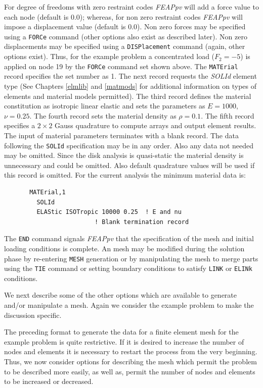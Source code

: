 For degree of freedoms with zero restraint codes {\sl FEAPpv} will add a force
value to each node (default is 0.0);
whereas, for non zero restraint codes {\sl FEAPpv} will
impose a displacement value (default is 0.0).  Non zero forces may
be specified using a {\tt FORCe} command (other options also exist
as described later).  Non zero displacements may be specified using
a {\tt DISPlacement} command (again, other options exist).
Thus, for the example problem
a concentrated load ($F_2 = -5$) is applied on node 19 by the {\tt FORCe}
command set shown above.
The {\tt MATErial} record specifies the set number as 1.  The
next record requests the {\it SOLId} element type (See Chapters \ref{elmlib}
and \ref{matmods} for
additional information on types of elements and material models permitted).
The third record defines the material constitution as isotropic linear
elastic and sets the parameters
as $E = 1000$, $\nu = 0.25$.
The fourth record sets the material density as $\rho = 0.1$.
The fifth record specifies a $2 \times 2$ Gauss quadrature
to compute arrays and output element results.
The input of material parameters terminates with a blank record.  The data
following the {\tt SOLId} specification may be in any order.  Also any data
not needed may be omitted.  Since the disk analysis is quasi-static the
material density is unnecessary and could be omitted.  Also default quadrature
values will be used if this record is omitted.  For the current analysis the
minimum material data is:
\begin{verbatim}
       MATErial,1
         SOLId
         ELAStic ISOTropic 10000 0.25  ! E and nu
                         ! Blank termination record
\end{verbatim}

The {\tt END}
command signals {\sl FEAPpv} that the specification of the mesh and initial
loading conditions is complete.  An mesh may be modified during
the solution phase by re-entering {\tt MESH} generation or by manipulating
the mesh to merge parts using the {\tt TIE} command
or setting boundary conditions to satisfy {\tt LINK} or {\tt ELINk} conditions.
\vskip 0.2in

We next describe some of the other options which are available
to generate and/or manipulate a mesh.
Again we consider the example problem to make the discussion specific.

The preceding format to generate the data for a finite element
mesh for the example problem is quite
restrictive.  If it is desired to increase the number of nodes and
elements it is necessary to restart the process from the very beginning.
Thus, we now consider options for describing the mesh which permit the
problem to be described more easily, as well as, permit the number of
nodes and elements to be increased or decreased.


